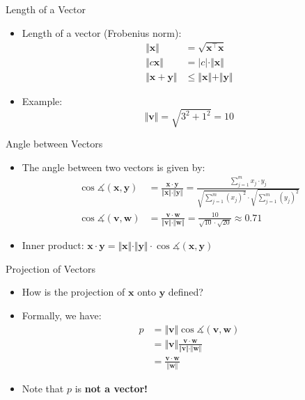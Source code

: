 \begin{frame}{Length of a Vector}{}
	\begin{itemize}
		\item Length of a vector (Frobenius norm):
		\begin{align}
			\Vert \bm{x} \Vert
				&= \sqrt{\bm{x}^{\intercal} \bm{x}}		\\[1mm]
			\Vert c \bm{x} \Vert
				&= \vert c \vert \cdot \Vert \bm{x} \Vert	\\[1mm]
			\Vert \bm{x} + \bm{y} \Vert
				&\le \Vert \bm{x} \Vert + \Vert \bm{y} \Vert
		\end{align}
		\item Example:
		\begin{equation*}
			\Vert \bm{v} \Vert = \sqrt{3^2 + 1^2} = 10
		\end{equation*}
	\end{itemize}
\end{frame}


\begin{frame}{Angle between Vectors}{}
	\begin{itemize}
		\item The angle between two vectors is given by:
		\begin{align}
			\cos \measuredangle (\bm{x}, \bm{y}) &= \frac{\bm{x} \cdot \bm{y}}{\Vert \bm{x} \Vert \cdot \Vert \bm{y} \Vert}
				= \frac{\sum_{j=1}^m x_j \cdot y_j}{\sqrt{\sum_{j=1}^m (x_j)^2} \cdot \sqrt{\sum_{j=1}^m (y_j)^2}} \\[3mm]
			\nonumber
			\cos \measuredangle (\bm{v}, \bm{w}) &= \frac{\bm{v} \cdot \bm{w}}{\Vert \bm{v} \Vert \cdot \Vert \bm{w} \Vert}
				= \frac{10}{\sqrt{10} \cdot \sqrt{20}} \approx 0.71
		\end{align}
		\vspace*{1mm}
		\item Inner product: $\bm{x} \cdot \bm{y}
			= \Vert \bm{x} \Vert \cdot \Vert \bm{y} \Vert \cdot \cos \measuredangle (\bm{x}, \bm{y})$
	\end{itemize}
\end{frame}


\begin{frame}{Projection of Vectors}{}
	\begin{itemize}
		\item How is the projection of $\bm{x}$ onto $\bm{y}$ defined?
		\item Formally, we have:
		\begin{align}
			\nonumber
			p 	&= \Vert \bm{v} \Vert \cos \measuredangle (\bm{v}, \bm{w}) 								\\[1mm]
			\nonumber
				&= \Vert \bm{v} \Vert \frac{\bm{v} \cdot \bm{w}}{\Vert \bm{v} \Vert \cdot \Vert \bm{w} \Vert} 	\\[1mm]
				&= \frac{\bm{v} \cdot \bm{w}}{\Vert \bm{w} \Vert}
		\end{align}
		\item Note that $p$ is \textbf{not a vector!}
	\end{itemize}
\end{frame}


